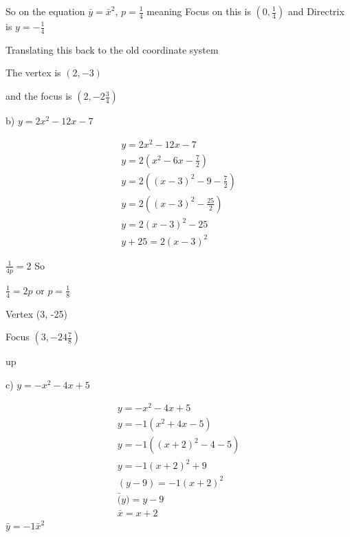 \documentclass[]{report}
\begin{document}
So on the equation $\bar{y} = \bar{x}^2$, $p = \frac{1}{4}$ meaning Focus on this is $(0, \frac{1}{4})$ and Directrix is $y = -\frac{1}{4}$

Translating this back to the old coordinate system

The vertex is $(2,-3)$

and the focus is $(2, -2\frac{3}{4})$


b) $y = 2x^2 - 12x - 7 $

\begin{align*}
y = 2x^2 - 12x - 7  \tag{1} \\
y = 2(x^2 - 6x - \frac{7}{2}) \\
y = 2((x - 3)^2 -9 - \frac{7}{2}) \\
y = 2((x- 3)^2 - \frac{25}{2}) \\
y = 2(x-3)^2 - 25\\
y + 25 = 2(x-3)^2
\end{align*}

$\frac{1}{4p} = 2$
So

$\frac{1}{4} = 2p$ or $p = \frac{1}{8}$

Vertex (3, -25)

Focus $(3, -24\frac{7}{8})$

up


c) $y = -x^2 -4x + 5$

\begin{align*}
y = -x^2 -4x + 5 \tag{1} \\
y = -1 (x^2 + 4x - 5) \tag{pulling the negative 1 out} \\
y = -1 ((x + 2)^2 -4  -5) \tag{factoring and completing the square} \\
y = -1(x+2)^2 + 9 \\
(y-9) = -1(x+2)^2 \\
\bar(y) = y-9 \\
\bar{x} = x+2
\end{align*}
$\bar{y} = -1\bar{x}^2$
\end{document}
